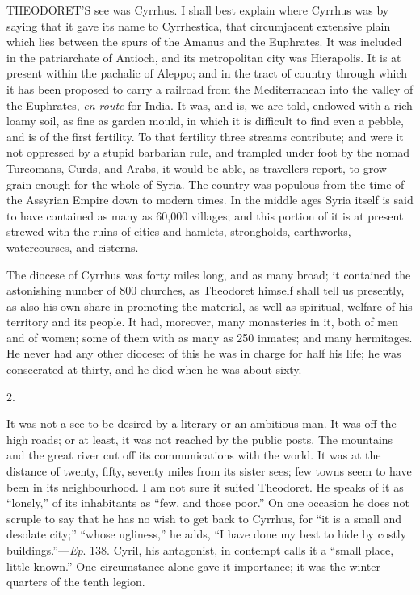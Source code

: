 THEODORET'S see was Cyrrhus. I shall best
explain where Cyrrhus was by saying that it gave its name to
Cyrrhestica, that circumjacent extensive plain which lies between the
spurs of the Amanus and the Euphrates. It was included in the
patriarchate of Antioch, and its metropolitan city was Hierapolis. It
is at present within the pachalic of Aleppo; and in the tract of
country through which it has been proposed to carry a railroad from
the Mediterranean into the valley of the Euphrates, \emph{en route}
for India. It was, and is, we are told, endowed with a rich loamy
soil, as fine as garden mould, in which it is difficult to find even a
pebble, and is of the first fertility. To that fertility three streams
contribute; and were it not oppressed by a stupid barbarian rule, and
trampled under foot by the nomad Turcomans, Curds, and Arabs, it would
be able, as travellers report, to grow grain enough for the whole of
Syria. The country was populous from the time of the Assyrian Empire
down to modern times. In the middle ages Syria itself is said to have
contained as many as 60,000 villages; and this portion of it is at
present strewed with the ruins of cities and hamlets, strongholds,
earthworks, watercourses, and cisterns.

The diocese of Cyrrhus was forty miles long, and as many broad; it
contained the astonishing number of 800 churches, as Theodoret himself
shall tell us presently, as also his own share in promoting the
material, as well as spiritual, welfare of his territory and its
people. It had, moreover, many monasteries in it, both of men and of
women; some of them with as many as 250 inmates; and many hermitages.
He never had any other diocese: of this he was in charge for half his
life; he was consecrated at thirty, and he died when he was about
sixty.

2.

It was not a see to be desired by a literary or an ambitious man.
It was off the high roads; or at least, it was not reached by the
public posts. The mountains and the great river cut off its
communications with the world. It was at the distance of twenty,
fifty, seventy miles from its sister sees; few towns seem to have been
in its neighbourhood. I am not sure it suited Theodoret. He speaks of
it as ``lonely,'' of its inhabitants as ``few, and those
poor.'' On one occasion he does not scruple to say that he has no
wish to get back to Cyrrhus, for ``it is a small and desolate
city;'' ``whose ugliness,'' he adds, ``I have done my
best to hide by costly buildings.''—\emph{Ep}. 138. Cyril, his
antagonist, in contempt calls it a ``small place, little
known.'' One circumstance alone gave it importance; it was the
winter quarters of the tenth legion.

